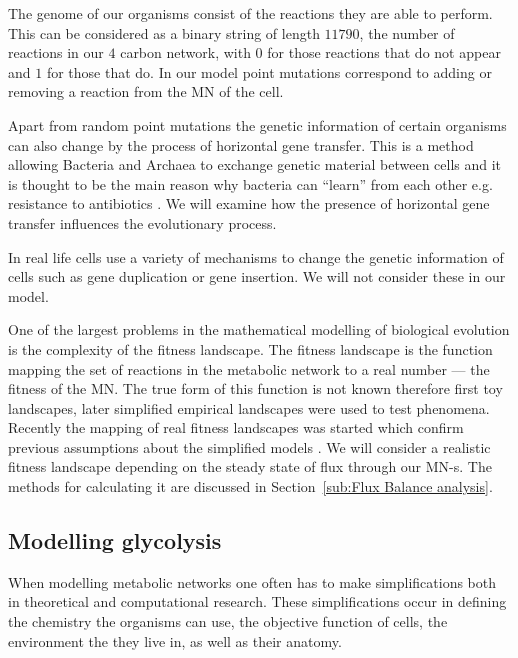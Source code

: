 \documentclass[a4paper,12pt]{article}
\begin{document}
	The genome of our organisms consist of the reactions they are able to perform. This can be considered as a binary string of length $11790$, the number of reactions in our $4$ carbon network, with $0$ for those reactions that do not appear and $1$ for those that do. In our model point mutations correspond to adding or removing a reaction from the MN of the cell.

	Apart from random point mutations the genetic information of certain organisms can also change by the process of horizontal gene transfer. This is a method allowing Bacteria and Archaea to exchange genetic material between cells and it is thought to be the main reason why bacteria can ``learn'' from each other e.g. resistance to antibiotics \cite{horizontalAntibiotics,horizontalgenetransfer}. We will examine how the presence of horizontal gene transfer influences the evolutionary process.

	In real life cells use a variety of mechanisms to change the genetic information of cells such as gene duplication or gene insertion. We will not consider these in our model. 


	One of the largest problems in the mathematical modelling of biological evolution is the complexity of the fitness landscape. The fitness landscape is the function mapping the set of reactions in the metabolic network to a real number --- the fitness of the MN. The true form of this function is not known therefore first toy landscapes, later simplified empirical landscapes were used to test phenomena. Recently the mapping of real fitness landscapes was started which confirm previous assumptions about the simplified models \cite{fitnesslandscape}. We will consider a realistic fitness landscape depending on the steady state of flux through our MN-s. The methods for calculating it are discussed in Section~\ref{sub:Flux Balance analysis}.

	\subsection{Modelling glycolysis}
	\label{sub:artificial_chemistries}


	When modelling metabolic networks one often has to make simplifications both in theoretical and computational research. These simplifications occur in defining the chemistry the organisms can use, the objective function of cells, the environment the they live in, as well as their anatomy. %
	
\end{document}
